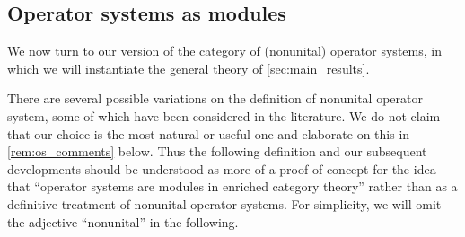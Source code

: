 \documentclass[11pt,onecolumn]{article}
\theoremstyle{plain}
\theoremstyle{remark}
\theoremstyle{definition}
\begin{document}
\subsection{Operator systems as modules}

We now turn to our version of the category of (nonunital) operator systems, in which we will instantiate the general theory of \cref{sec:main_results}.

There are several possible variations on the definition of nonunital operator system, some of which have been considered in the literature.
We do not claim that our choice is the most natural or useful one and elaborate on this in \cref{rem:os_comments} below.
Thus the following definition and our subsequent developments should be understood as more of a proof of concept for the idea that ``operator systems are modules in enriched category theory'' rather than as a definitive treatment of nonunital operator systems.
For simplicity, we will omit the adjective ``nonunital'' in the following.
\end{document}
